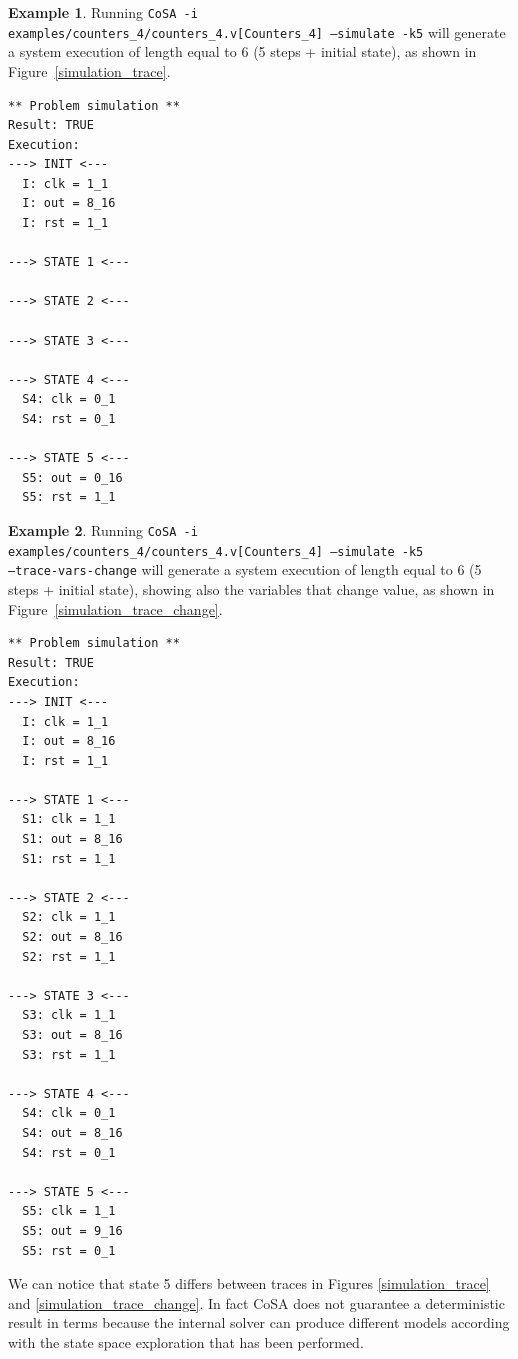 \documentclass{article}
\theoremstyle{definition}
\newtheorem{example}{Example}[section]
\begin{document}
\begin{example}
  Running \texttt{CoSA -i examples/counters\_4/counters\_4.v[Counters\_4] --simulate -k5}
  will generate a system execution of length equal to 6 (5 steps + initial state), as
  shown in Figure~\ref{simulation_trace}.

\begin{lstlisting}[frame=single,language=ets,caption=Simulation Counter\_4 ,label=simulation_trace]
** Problem simulation **
Result: TRUE
Execution:
---> INIT <---
  I: clk = 1_1
  I: out = 8_16
  I: rst = 1_1

---> STATE 1 <---

---> STATE 2 <---

---> STATE 3 <---

---> STATE 4 <---
  S4: clk = 0_1
  S4: rst = 0_1

---> STATE 5 <---
  S5: out = 0_16
  S5: rst = 1_1
\end{lstlisting}

\end{example}

\begin{example}
  Running \texttt{CoSA -i
    examples/counters\_4/counters\_4.v[Counters\_4] --simulate -k5\\
    --trace-vars-change} will generate a system execution of length
  equal to 6 (5 steps + initial state), showing also the variables
  that change value, as shown in Figure~\ref{simulation_trace_change}.

\begin{lstlisting}[frame=single,language=ets,caption=Simulation Counter\_4 (with changing values),label=simulation_trace_change]
** Problem simulation **
Result: TRUE
Execution:
---> INIT <---
  I: clk = 1_1
  I: out = 8_16
  I: rst = 1_1

---> STATE 1 <---
  S1: clk = 1_1
  S1: out = 8_16
  S1: rst = 1_1

---> STATE 2 <---
  S2: clk = 1_1
  S2: out = 8_16
  S2: rst = 1_1

---> STATE 3 <---
  S3: clk = 1_1
  S3: out = 8_16
  S3: rst = 1_1

---> STATE 4 <---
  S4: clk = 0_1
  S4: out = 8_16
  S4: rst = 0_1

---> STATE 5 <---
  S5: clk = 1_1
  S5: out = 9_16
  S5: rst = 0_1
\end{lstlisting}

\end{example}


We can notice that state 5 differs between traces in Figures
\ref{simulation_trace} and \ref{simulation_trace_change}. In fact CoSA
does not guarantee a deterministic result in terms because the
internal solver can produce different models according with the state
space exploration that has been performed.
\end{document}
